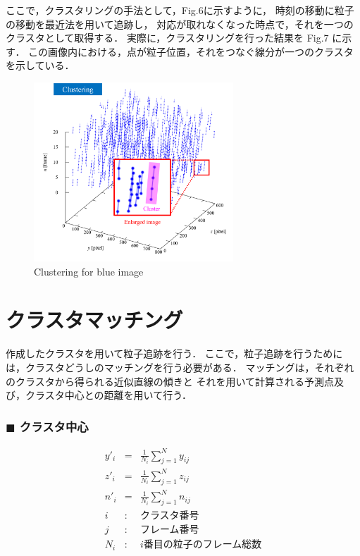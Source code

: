 \documentclass[twocolumn,a4j]{jsarticle}
\begin{document}
ここで，クラスタリングの手法として，Fig.6に示すように，
時刻の移動に粒子の移動を最近法を用いて追跡し，
対応が取れなくなった時点で，それを一つのクラスタとして取得する．
実際に，クラスタリングを行った結果を Fig.7 に示す．
この画像内における，点が粒子位置，それをつなぐ線分が一つのクラスタを示している．

\begin{figure}[htbp]
	\centering
	\includegraphics[keepaspectratio, width=75mm]{../images/clustering_for_blue_image.png}
	\caption{Clustering for blue image}
\end{figure}

\section{クラスタマッチング}
作成したクラスタを用いて粒子追跡を行う．
ここで，粒子追跡を行うためには，クラスタどうしのマッチングを行う必要がある．
マッチングは，それぞれのクラスタから得られる近似直線の傾きと
それを用いて計算される予測点及び，クラスタ中心との距離を用いて行う．\\

\subsubsection*{$\blacksquare$ クラスタ中心}
\begin{eqnarray*}
	y'_i &=& \frac{1}{N_i} \sum_{j=1}^{N} y_{ij} \\
	z'_i &=& \frac{1}{N_i} \sum_{j=1}^{N} z_{ij} \\
	n'_i &=& \frac{1}{N_i} \sum_{j=1}^{N} n_{ij} \\
	i &:& \text{クラスタ番号}\\
	j &:& \text{フレーム番号}\\
	N_i &:& i \text{番目の粒子のフレーム総数}
\end{eqnarray*}
\end{document}
